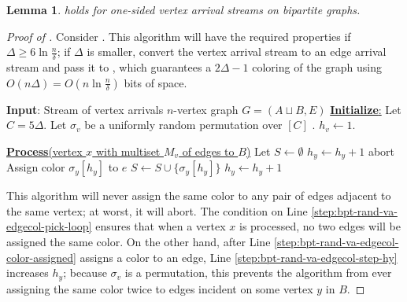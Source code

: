 \documentclass[10pt]{article}
\newtheorem{lemma}[theorem]{Lemma}
\theoremstyle{definition}\newtheorem{definition}[lemma]{Definition}
\theoremstyle{remark}  \newtheorem*{remark}{Remark}
\begin{document}

\begin{lemma}\label{lem:online-bpt-rand-va-edgecol}
   holds for one-sided vertex arrival streams on bipartite graphs.
\end{lemma}
\begin{proof}[Proof of ]
  Consider . This algorithm will have the required properties if $\Delta \ge 6 \ln \frac{n}{\delta}$; if $\Delta$ is smaller, convert the vertex arrival stream to an edge arrival stream and pass it to , which guarantees a $2\Delta-1$ coloring of the graph using $O(n \Delta) = O(n \ln \frac{n}{\delta})$ bits of space.

  \begin{algorithm}[htb!]
    \caption{Randomized algorithm for $5 \Delta$ edge coloring for (adversarial) one sided vertex arrival bipartite streams\label{alg:bpt-rand-va-edgecol}}
    \begin{algorithmic}[1]
    \Statex \textbf{Input}: Stream of vertex arrivals $n$-vertex graph $G=(A \sqcup B,E)$
      \Statex
      \Statex \underline{\textbf{Initialize}:}
      \State Let $C = 5 \Delta$.
        \State Let $\sigma_v$ be a uniformly random permutation over $[C]$ .
        \State $h_v \gets 1$.
            
      \EndFor
      
    \Statex \underline{\textbf{Process}(vertex $x$ with multiset $M_v$ of edges to $B$)}
      \State Let $S \gets \emptyset$ 
        \label{step:bpt-rand-va-edgecol-pick-loop}
          \State $h_y \gets h_y + 1$
        \EndWhile
        \State abort \EndIf
        \State Assign color $\sigma_y[h_y]$ to $e$\label{step:bpt-rand-va-edgecol-color-assigned}
        \State $S \gets S \cup \{\sigma_y[h_y] \}$
        \State $h_y \gets h_y + 1$ \label{step:bpt-rand-va-edgecol-step-hy}
      \EndFor
    \end{algorithmic}
  \end{algorithm}

  This algorithm will never assign the same color to any pair of edges adjacent to
  the same vertex; at worst, it will abort. The condition on
  Line \ref{step:bpt-rand-va-edgecol-pick-loop} ensures
  that when a vertex $x$ is processed, no two edges will be assigned the same color.
  On the other hand, after Line \ref{step:bpt-rand-va-edgecol-color-assigned} assigns
  a color to an edge, Line \ref{step:bpt-rand-va-edgecol-step-hy} increases $h_y$;
  because $\sigma_v$ is a permutation, this prevents the algorithm from ever
  assigning the same color twice to edges incident on some vertex $y$ in $B$.
  

\end{proof}
\end{document}
